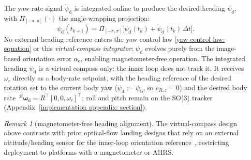 \documentclass{IEEEtaes}
\theoremstyle{definition}
\theoremstyle{remark}
\newtheorem{remark}{Remark}
\begin{document}
The yaw-rate signal $\dot{\psi}_\text{d}$ is integrated online to produce the desired heading $\psi_\text{d}$, with $\Pi_{[-\pi,\pi]}(\cdot)$ the angle-wrapping projection:
\begin{equation} \label{psi d integrator: equation}
    \psi_\text{d}(t_{k+1}) = \Pi_{[-\pi,\pi]}\!\big[\psi_\text{d}(t_k) + \dot{\psi}_\text{d}(t_k)\,\Delta t\big].
\end{equation}
No external heading reference enters the yaw control law \eqref{yaw control law: equation} or this \emph{virtual-compass integrator}: $\psi_\text{d}$ evolves purely from the image-based orientation error $\alpha_\text{e}$, enabling magnetometer-free operation. The integrated heading $\psi_\text{d}$ is a virtual compass only: the inner loop does not track it. It receives $\omega_r$ directly as a body-rate setpoint, with the heading reference of the desired rotation set to the current body yaw ($\psi_\text{d}:=\psi_\text{b}$, so $e_{R,z}=0$) and the desired body rate $\,^\mathcal{B}\boldsymbol{\omega}_\text{d}=R^\top[0,0,\omega_r]^\top$; roll and pitch remain on the SO(3) tracker (Appendix~\ref{implementation appendix: section}).

\begin{remark}[magnetometer-free heading alignment]\label{rem:magfree} The virtual-compass design above contrasts with prior optical-flow landing designs that rely on an external attitude/heading sensor for the inner-loop orientation reference~\cite{herisse2012}, restricting deployment to platforms with a magnetometer or AHRS.\end{remark}
\end{document}
